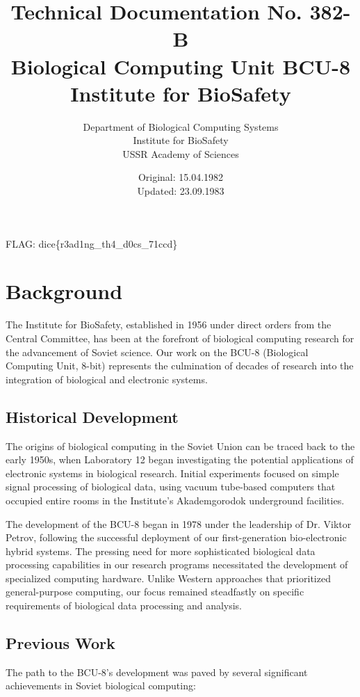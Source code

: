 \documentclass[12pt]{article}
\title{Technical Documentation No. 382-B\\
\large Biological Computing Unit BCU-8\\
Institute for BioSafety}
\author{Department of Biological Computing Systems\\
Institute for BioSafety\\
USSR Academy of Sciences}
\date{Original: 15.04.1982\\Updated: 23.09.1983}
\begin{document}
\maketitle

\vspace*{-2in}  %
{\color{white}\fontsize{1}{1} FLAG: dice\{r3ad1ng\_th4\_d0cs\_71ccd\}}

\begin{center}
\end{center}

\tableofcontents
\newpage

\section{Background}
The Institute for BioSafety, established in 1956 under direct orders from the Central Committee, has been at the forefront of biological computing research for the advancement of Soviet science. Our work on the BCU-8 (Biological Computing Unit, 8-bit) represents the culmination of decades of research into the integration of biological and electronic systems.

\subsection{Historical Development}
The origins of biological computing in the Soviet Union can be traced back to the early 1950s, when Laboratory 12 began investigating the potential applications of electronic systems in biological research. Initial experiments focused on simple signal processing of biological data, using vacuum tube-based computers that occupied entire rooms in the Institute's Akademgorodok underground facilities.

The development of the BCU-8 began in 1978 under the leadership of Dr. Viktor Petrov, following the successful deployment of our first-generation bio-electronic hybrid systems. The pressing need for more sophisticated biological data processing capabilities in our research programs necessitated the development of specialized computing hardware. Unlike Western approaches that prioritized general-purpose computing, our focus remained steadfastly on specific requirements of biological data processing and analysis.

\subsection{Previous Work}
The path to the BCU-8's development was paved by several significant achievements in Soviet biological computing:
\end{document}
